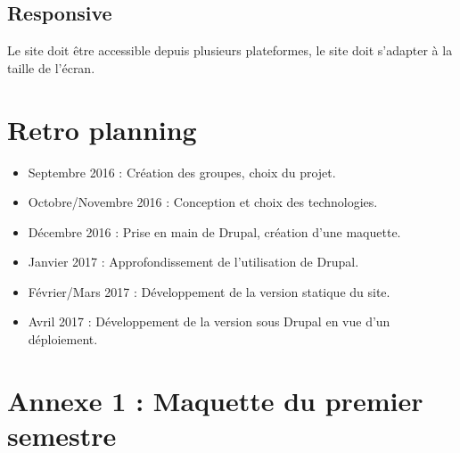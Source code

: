 \documentclass[11pt]{report}
\begin{document}
\subsection*{Responsive}
Le site doit être accessible depuis plusieurs plateformes, le site doit s'adapter
à la taille de l'écran.


\section{Retro planning}

\begin{itemize}
	\item Septembre 2016 : Création des groupes, choix du projet.
	\item Octobre/Novembre 2016 : Conception et choix des technologies.
	\item Décembre 2016 : Prise en main de Drupal, création d'une maquette.
	\item Janvier 2017 : Approfondissement de l'utilisation de Drupal.
	\item Février/Mars 2017 : Développement de la version statique du site.
	\item Avril 2017 : Développement de la version sous Drupal en vue d'un déploiement.
\end{itemize}


\newpage

\section*{Annexe 1 : Maquette du premier semestre}
\end{document}
